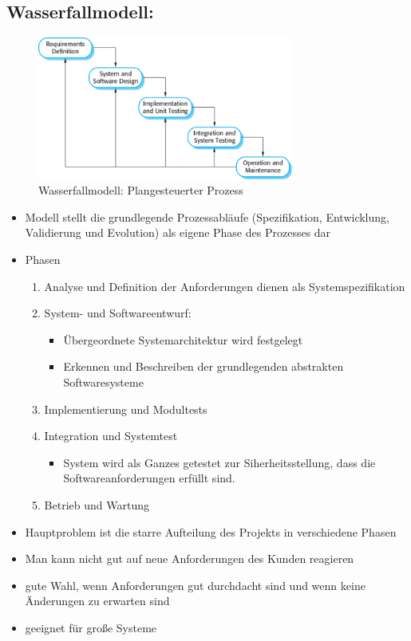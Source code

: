 \subsection{Wasserfallmodell:}
\begin{figure}[h] 
  \centering
     \includegraphics[width=0.75\textwidth]{mainmatter/pics/waterfall.png}
  \caption{Wasserfallmodell: Plangesteuerter Prozess}
\end{figure}
\begin{itemize}
    \item Modell stellt die grundlegende Prozessabläufe (Spezifikation, Entwicklung, Validierung und Evolution) als eigene Phase des Prozesses dar
    \item Phasen
    \begin{enumerate}
        \item Analyse und Definition der Anforderungen dienen als Systemspezifikation
        \item System- und Softwareentwurf:
        \begin{itemize}
            \item Übergeordnete Systemarchitektur wird festgelegt
            \item Erkennen und Beschreiben  der grundlegenden abstrakten Softwaresysteme 
        \end{itemize}
        \item Implementierung und Modultests
        \item Integration und Systemtest
        \begin{itemize}
            \item System wird als Ganzes getestet zur Siherheitsstellung, dass die Softwareanforderungen erfüllt sind. 
        \end{itemize}
        \item Betrieb und Wartung
    \end{enumerate}
    \item Hauptproblem ist die starre Aufteilung des Projekts in verschiedene Phasen
    \item Man kann nicht gut auf neue Anforderungen des Kunden reagieren
    \item gute \glqq{}Wahl\grqq{}, wenn Anforderungen gut durchdacht sind und wenn keine Änderungen zu erwarten sind
    \item geeignet für große Systeme
\end{itemize}

